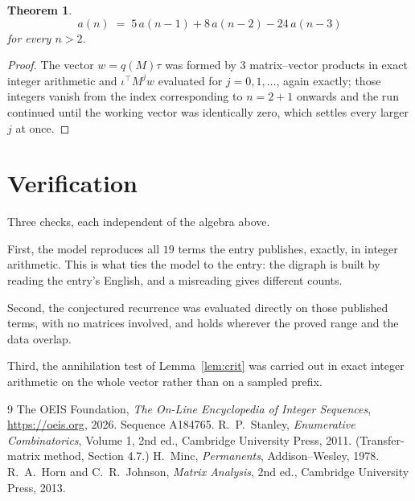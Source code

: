 \documentclass[11pt,a4paper]{article}
\theoremstyle{plain}
\newtheorem{theorem}{Theorem}
\theoremstyle{definition}
\begin{document}
\begin{theorem}
\[
a(n)\;=\;5\,a(n-1) + 8\,a(n-2) - 24\,a(n-3)
\]
for every $n>2$.
\end{theorem}

\begin{proof}
The vector $w=q(M)\tau$ was formed by $3$ matrix--vector products in exact integer
arithmetic and $\iota^{\!\top}M^{j}w$ evaluated for $j=0,1,\dots$, again exactly; those
integers vanish from the index corresponding to $n=2+1$ onwards and the run continued
until the working vector was identically zero, which settles every larger $j$ at once.
\end{proof}

\section{Verification}

Three checks, each independent of the algebra above.

First, the model reproduces all $19$ terms the entry publishes, exactly, in integer
arithmetic. This is what ties the model to the entry: the digraph is built by reading the
entry's English, and a misreading gives different counts.

Second, the conjectured recurrence was evaluated directly on those published terms, with no
matrices involved, and holds wherever the proved range and the data overlap.

Third, the annihilation test of Lemma~\ref{lem:crit} was carried out in exact integer
arithmetic on the whole vector rather than on a sampled prefix.

\begin{thebibliography}{9}
 The OEIS Foundation, \emph{The On-Line Encyclopedia of Integer
Sequences}, \url{https://oeis.org}, 2026. Sequence A184765.
 R.~P.~Stanley, \emph{Enumerative Combinatorics}, Volume 1, 2nd ed.,
Cambridge University Press, 2011. (Transfer-matrix method, Section 4.7.)
 H.~Minc, \emph{Permanents}, Addison--Wesley, 1978.
 R.~A.~Horn and C.~R.~Johnson, \emph{Matrix Analysis}, 2nd ed., Cambridge
University Press, 2013.
\end{thebibliography}
\end{document}
